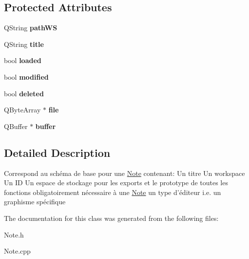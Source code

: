 \subsection*{\-Protected \-Attributes}
\begin{DoxyCompactItemize}
\item 
\hypertarget{classNote_a277563af352bd04c5603bdb0bb30869e}{\-Q\-String {\bfseries path\-W\-S}}\label{classNote_a277563af352bd04c5603bdb0bb30869e}

\item 
\hypertarget{classNote_ae8e10911c66931c9285925e1760816fd}{\-Q\-String {\bfseries title}}\label{classNote_ae8e10911c66931c9285925e1760816fd}

\item 
\hypertarget{classNote_a9edcd23344e067ded660deb97bc5ca4a}{bool {\bfseries loaded}}\label{classNote_a9edcd23344e067ded660deb97bc5ca4a}

\item 
\hypertarget{classNote_aaa3ed93cab78b04eebb5b5ba52722871}{bool {\bfseries modified}}\label{classNote_aaa3ed93cab78b04eebb5b5ba52722871}

\item 
\hypertarget{classNote_aeae11c0f8281ba3bfc7ec907cc9cf0b9}{bool {\bfseries deleted}}\label{classNote_aeae11c0f8281ba3bfc7ec907cc9cf0b9}

\item 
\hypertarget{classNote_a76bf0fff374aed4c754c262eeffc62bc}{\-Q\-Byte\-Array $\ast$ {\bfseries file}}\label{classNote_a76bf0fff374aed4c754c262eeffc62bc}

\item 
\hypertarget{classNote_ad1def1d9f3e46da1b0a577ac17c73401}{\-Q\-Buffer $\ast$ {\bfseries buffer}}\label{classNote_ad1def1d9f3e46da1b0a577ac17c73401}

\end{DoxyCompactItemize}


\subsection{\-Detailed \-Description}
\-Correspond au schéma de base pour une \hyperlink{classNote}{\-Note} contenant\-: \-Un titre \-Un workspace \-Un \-I\-D \-Un espace de stockage pour les exports et le prototype de toutes les fonctions obligatoirement nécessaire à une \hyperlink{classNote}{\-Note} un type d'éditeur i.\-e. un graphisme spécifique 

\-The documentation for this class was generated from the following files\-:\begin{DoxyCompactItemize}
\item 
\-Note.\-h\item 
\-Note.\-cpp\end{DoxyCompactItemize}
